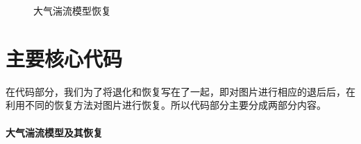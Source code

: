 \documentclass[11pt]{ctexart}
\begin{document}
\begin{figure}[htbp]
{\begin{minipage}[t]{0.4\linewidth}
        \end{minipage}
        }
        \centering
        \caption{大气湍流模型恢复}\label{fig:digit}
  \end{figure}


\section{主要核心代码}

在代码部分，我们为了将退化和恢复写在了一起，即对图片进行相应的退后后，在利用不同的恢复方法对图片进行恢复。所以代码部分主要分成两部分内容。

\paragraph{大气湍流模型及其恢复}
\end{document}
